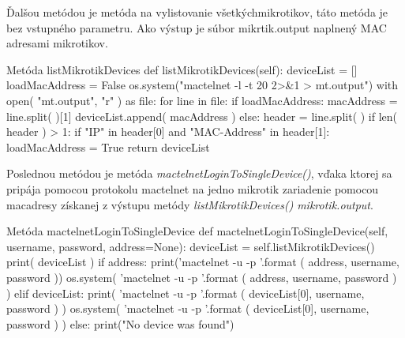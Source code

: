 Ďalšou metódou je metóda na vylistovanie všetkýchmikrotikov, táto metóda je bez vstupného parametru. Ako výstup je súbor mikrtik.output naplnený MAC adresami mikrotikov. 
\\
\begin{sexylisting}{Metóda listMikrotikDevices}
    def listMikrotikDevices(self):
        deviceList = []
        loadMacAddress = False
        os.system("mactelnet -l -t 20 
        2>&1 > mt.output")
        with open( "mt.output", "r" ) 
        as file:
            for line in file:
                if loadMacAddress:
                   macAddress = line.split( )[1]
                   deviceList.append( macAddress )
                else:
                    header = line.split( )
                    if len( header ) > 1:
                        if "IP" in header[0] 
                        and "MAC-Address" 
                        in header[1]:
                            loadMacAddress = True
        return deviceList
\end{sexylisting}
Poslednou metódou je metóda \textit{mactelnetLoginToSingleDevice()}, vďaka ktorej sa pripája pomocou protokolu mactelnet na jedno mikrotik zariadenie pomocou macadresy získanej z výstupu metódy \textit{listMikrotikDevices()} \textit{mikrotik.output}.
\begin{sexylisting}{Metóda mactelnetLoginToSingleDevice}
    def mactelnetLoginToSingleDevice(self, username, 
    password, address=None):
        deviceList = self.listMikrotikDevices()
        print( deviceList )
        if address:
            print('mactelnet {} -u {} -p {}'.format
            ( address, username, password ))
            os.system( 'mactelnet {} -u {} -p {}'.format
            ( address, username, password ) )
        elif deviceList:
            print( 'mactelnet {} -u {} -p {}'.format
            ( deviceList[0], username, password ) )
            os.system( 'mactelnet {} -u {} -p {}'.format
            ( deviceList[0], username, password ) )
        else:
            print("No device was found")
\end{sexylisting}
